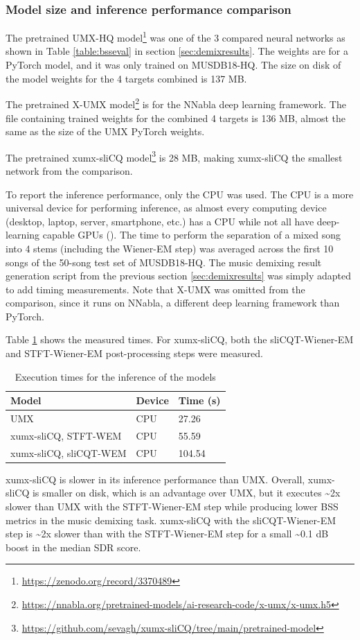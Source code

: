 \documentclass[report.tex]{subfiles}
\begin{document}
\newpagefill

\subsubsection{Model size and inference performance comparison}
\label{sec:inferenceperf}

The pretrained UMX-HQ model\footnote{\url{https://zenodo.org/record/3370489}} was one of the 3 compared neural networks as shown in Table \ref{table:bsseval} in section \ref{sec:demixresults}. The weights are for a PyTorch model, and it was only trained on MUSDB18-HQ. The size on disk of the model weights for the 4 targets combined is 137 MB.

The pretrained X-UMX model\footnote{\url{https://nnabla.org/pretrained-models/ai-research-code/x-umx/x-umx.h5}} is for the NNabla deep learning framework. The file containing trained weights for the combined 4 targets is 136 MB, almost the same as the size of the UMX PyTorch weights.

The pretrained xumx-sliCQ model\footnote{\url{https://github.com/sevagh/xumx-sliCQ/tree/main/pretrained-model}} is 28 MB, making xumx-sliCQ the smallest network from the comparison.

To report the inference performance, only the CPU was used. The CPU is a more universal device for performing inference, as almost every computing device (desktop, laptop, server, smartphone, etc.) has a CPU while not all have deep-learning capable GPUs (\cite{deepcpuinf, deepcpuinf2}). The time to perform the separation of a mixed song into 4 stems (including the Wiener-EM step) was averaged across the first 10 songs of the 50-song test set of MUSDB18-HQ. The music demixing result generation script from the previous section \ref{sec:demixresults} was simply adapted to add timing measurements. Note that X-UMX was omitted from the comparison, since it runs on NNabla, a different deep learning framework than PyTorch.

Table \ref{table:infperf} shows the measured times. For xumx-sliCQ, both the sliCQT-Wiener-EM and STFT-Wiener-EM post-processing steps were measured.

\begin{table}[ht]
	\centering
	\begin{tabular}{ |l|l|l| }
	 \hline
		Model & Device & Time (s) \\
	 \hline
	 \hline
		UMX & CPU & 27.26  \\
	 \hline
		xumx-sliCQ, STFT-WEM & CPU & 55.59  \\
	 \hline
		xumx-sliCQ, sliCQT-WEM & CPU & 104.54  \\
	 \hline
\end{tabular}
	\caption{Execution times for the inference of the models}
	\label{table:infperf}
\end{table}

xumx-sliCQ is slower in its inference performance than UMX. Overall, xumx-sliCQ is smaller on disk, which is an advantage over UMX, but it executes \textasciitilde2x slower than UMX with the STFT-Wiener-EM step while producing lower BSS metrics in the music demixing task. xumx-sliCQ with the sliCQT-Wiener-EM step is \textasciitilde2x slower than with the STFT-Wiener-EM step for a small \textasciitilde0.1 dB boost in the median SDR score.
\end{document}
